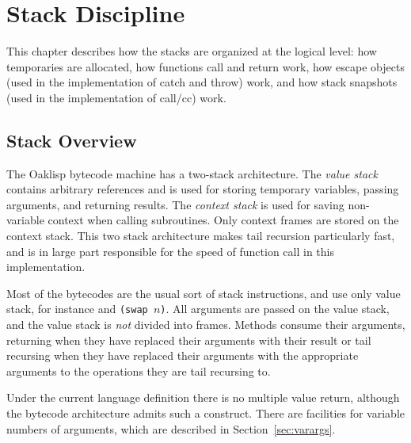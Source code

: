 %
%
%


\chapter{Stack Discipline}

This chapter describes how the stacks are organized at the logical
level: how temporaries are allocated, how functions call and return
work, how escape objects (used in the implementation of catch and
throw) work, and how stack snapshots (used in the implementation of
call/cc) work.

\section{Stack Overview}

The Oaklisp bytecode machine has a two-stack architecture.  The 
\emph{value stack} contains arbitrary references and is used for storing
temporary variables, passing arguments, and returning results.  The
\emph{context stack} is used for saving non-variable context when
calling subroutines.  Only context frames are stored on the context
stack.  This two stack architecture makes tail recursion particularly
fast, and is in large part responsible for the speed of function call
in this implementation.

Most of the bytecodes are the usual sort of stack instructions, and
use only value stack, for instance  and \texttt{(swap
$n$)}.  All arguments are passed on the value stack,
and the value stack is \emph{not} divided into frames.  Methods consume
their arguments, returning when they have replaced their arguments
with their result or tail recursing when they have replaced their
arguments with the appropriate arguments to the operations they are
tail recursing to.

Under the current language definition there is no multiple value
return, although the bytecode architecture admits such a construct.
There are facilities for variable numbers of arguments, which are
described in Section~\ref{sec:varargs}.


